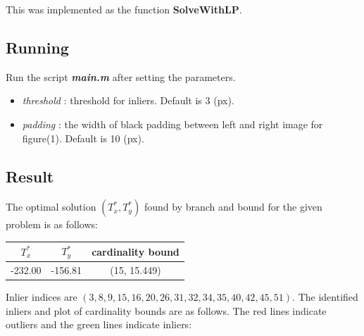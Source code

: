 \documentclass[paper=a4, fontsize=11pt]{scrartcl} %
\numberwithin{equation}{section} %
\numberwithin{figure}{section} %
\numberwithin{table}{section} %
\newcommand{\filename}[1]{\textbf{\textit{#1}}}
\newcommand{\funcname}[1]{\textbf{#1}}
\begin{document}
This was implemented as the function \funcname{SolveWithLP}.

\subsection{Running}

Run the script \filename{main.m} after setting the parameters. 

\begin{itemize}
\item \textit{threshold} : threshold for inliers. Default is 3 (px).
\item \textit{padding} : the width of black padding between left and right image for figure(1). Default is 10 (px).
\end{itemize}

\subsection{Result}

The optimal solution $(T_{x}^*, T_{y}^*)$ found by branch and bound for the given problem is as follows:

\begin{table}[h]
 \label{tab:title} 
\centering
\begin{tabular}{| c | c | c | }
\hline 
$T_{x}^*$		&	$T_{y}^*$		&	cardinality bound \\
\hline  
-232.00		&	-156.81		&	(15, 15.449) \\
\hline
\end{tabular}
\end{table}

Inlier indices are $(3, 8, 9, 15, 16, 20, 26, 31, 32, 34, 35, 40, 42, 45, 51)$. The identified inliers and plot of cardinality bounds are as follows. The red lines indicate outliers and the green lines indicate inliers: 
\end{document}
